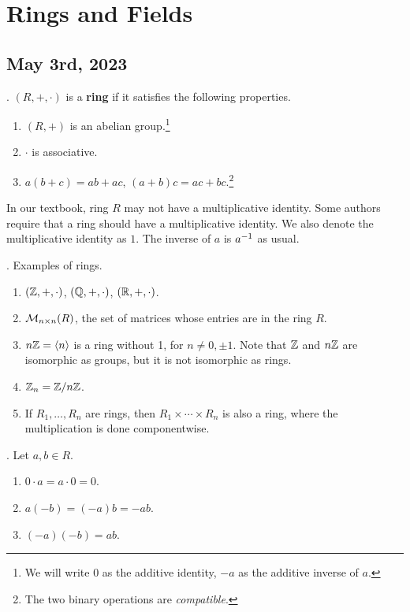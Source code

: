 \setcounter{chapter}{3}
\chapter{Rings and Fields}

\section*{May 3rd, 2023}

\setcounter{topic}{17}

.  \((R, +, \cdot)\) is a \textbf{ring} if it satisfies the following properties.
\begin{enumerate}
    \item \((R, +)\) is an abelian group.\footnote{We will write 0 as the additive identity, \(-a\) as the additive inverse of \(a\).}
    \item \(\cdot\) is associative.
    \item {} \(a (b + c) = ab + ac\), \((a + b) c = ac + bc\).\footnote{The two binary operations are \textit{compatible}.}
\end{enumerate}

\rmk In our textbook, ring \(R\) may not have a multiplicative identity. Some authors require that a ring should have a multiplicative identity. We also denote the multiplicative identity as \(1\). The inverse of \(a\) is \(a^{-1}\) as usual.

\ex. Examples of rings.
\begin{enumerate}
    \item \((\mathbb{Z}, +, \cdot)\), \((\mathbb{Q}, +, \cdot)\), \((\mathbb{R}, +, \cdot)\).
    \item \(\mathcal{M}_{n\times n}(R)\), the set of matrices whose entries are in the ring \(R\).
    \item \(n\mathbb{Z} = \left\langle n \right\rangle\) is a ring without 1, for \(n \neq 0, \pm 1\). Note that \(\mathbb{Z}\) and \(n\mathbb{Z}\) are isomorphic as groups, but it is not isomorphic as rings.
    \item \(\mathbb{Z}_n = \mathbb{Z} / n\mathbb{Z}\).
    \item {} If \(R_1, \dots, R_n\) are rings, then \(R_1 \times \cdots \times R_n\) is also a ring, where the multiplication is done componentwise.
\end{enumerate}

\thm. Let \(a, b \in R\).
\begin{enumerate}
    \item \(0 \cdot a = a \cdot 0 = 0\).
    \item \(a(-b) = (-a)b = -ab\).
    \item \((-a)(-b) = ab\).
\end{enumerate}


